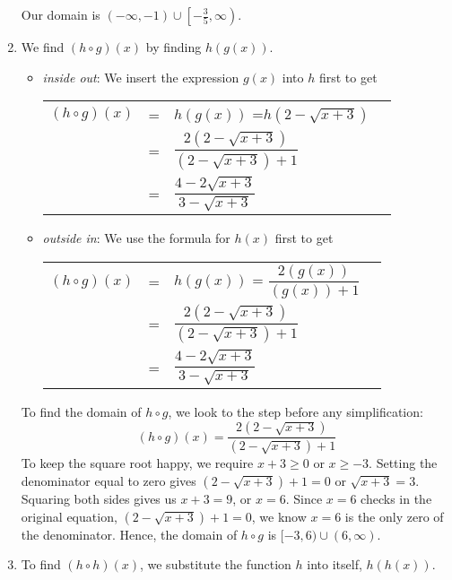 \begin{ex}
\begin{enumerate}
\begin{center}
\end{center}

Our domain is $(-\infty, -1) \cup \left[-\frac{3}{5}, \infty\right)$.

\item  We find $(h \circ g)(x)$ by finding $h(g(x))$.

\begin{itemize}

\item  \textit{inside out}: We insert the expression $g(x)$ into $h$ first to get
\begin{longtable}{rclr} $(h \circ g)(x)$ & = & $h(g(x))$ =$h\left(2-\sqrt{x+3}\right)$ & \\ [2pt]
 & = & $\dfrac{2 \left(2-\sqrt{x+3} \right)}{\left(2-\sqrt{x+3}\right)+1}$ & \\[12pt] 
 & = & $\dfrac{4-2\sqrt{x+3}}{3-\sqrt{x+3}}$ & \\
  \end{longtable}

\item  \textit{outside in}:  We use the formula for $h(x)$ first to get
\begin{longtable}{rclr} $(h \circ g)(x)$ & = & $h(g(x))$ = $\dfrac{2 \left(g(x)\right)}{\left( g(x)\right) + 1}$ & \\ [12pt]
 & = & $\dfrac{2 \left(2-\sqrt{x+3} \right)}{\left(2-\sqrt{x+3}\right)+1}$ & \\[12pt] 
 & = & $\dfrac{4-2\sqrt{x+3}}{3-\sqrt{x+3}}$ & \\
  \end{longtable}
 
 \end{itemize}

To find the domain of $h \circ g$, we look to the step before any simplification:  \[(h \circ g)(x) =  \frac{2 \left(2-\sqrt{x+3} \right)}{\left(2-\sqrt{x+3}\right)+1}\]  To keep the square root happy, we require $x+3 \geq 0$ or $x \geq -3$.  Setting the denominator equal to zero gives $\left(2-\sqrt{x+3}\right)+1=0$ or $\sqrt{x+3} = 3$.  Squaring both sides gives us $x+3=9$, or $x=6$.  Since $x=6$ checks in the original equation, $\left(2-\sqrt{x+3}\right)+1=0$, we know $x=6$ is the only zero of the denominator.  Hence, the domain of $h \circ g$ is $[-3,6) \cup (6, \infty)$.

\item  To find $(h \circ h)(x)$, we substitute the function $h$ into itself, $h(h(x))$.

\begin{itemize}


\end{itemize}
\end{enumerate}
\end{ex}
